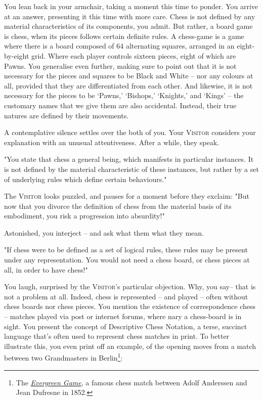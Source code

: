 You lean back in your armchair, taking a moment this time to ponder. You arrive at an answer, presenting it this time with more care. Chess is not defined by any material characteristics of its components, you admit. But rather, a board game is chess, when its pieces follows certain definite rules. A chess-game is a game where there is a board composed of 64 alternating squares, arranged in an eight-by-eight grid. Where each player controls sixteen pieces, eight of which are Pawns. You generalise even further, making sure to point out that it is not necessary for the pieces and squares to be Black and White -- nor any colours at all, provided that they are differentiated from each other. And likewise, it is not necessary for the pieces to be `Pawns,' `Bishops,' `Knights,' and `Kings' -- the customary names that we give them are also accidental. Instead, their true natures are defined by their movements.

A contemplative silence settles over the both of you. Your \textsc{Visitor} considers your explanation with an unusual attentiveness. After a while, they speak.

"You state that chess a general being, which manifests in particular instances. It is not defined by the material characteristic of these instances, but rather by a set of underlying rules which define certain behaviours."

The \textsc{Visitor} looks puzzled, and pauses for a moment before they exclaim: "But now that you divorce the definition of chess from the material basis of its embodiment, you risk a progression into absurdity!"

Astonished, you interject -- and ask what them what they mean.

"If chess were to be defined as a set of logical rules, these rules may be present under any representation. You would not need a chess board, or chess pieces at all, in order to have chess!"

You laugh, surprised by the \textsc{Visitor}'s particular objection. Why, you say-- that is not a problem at all. Indeed, chess is represented -- and played -- often without chess boards nor chess pieces. You mention the existence of correspondence chess -- matches played via post or internet forums, where nary a chess-board is in sight. You present the concept of Descriptive Chess Notation, a terse, succinct language that's often used to represent chess matches in print. To better illustrate this, you even print off an example, of the opening moves from a match between two Grandmasters in Berlin\footnote{The \href{https://en.wikipedia.org/wiki/Evergreen_Game}{\emph{Evergreen Game}}, a famous chess match between Adolf Anderssen and Jean Dufresne in 1852.}:

